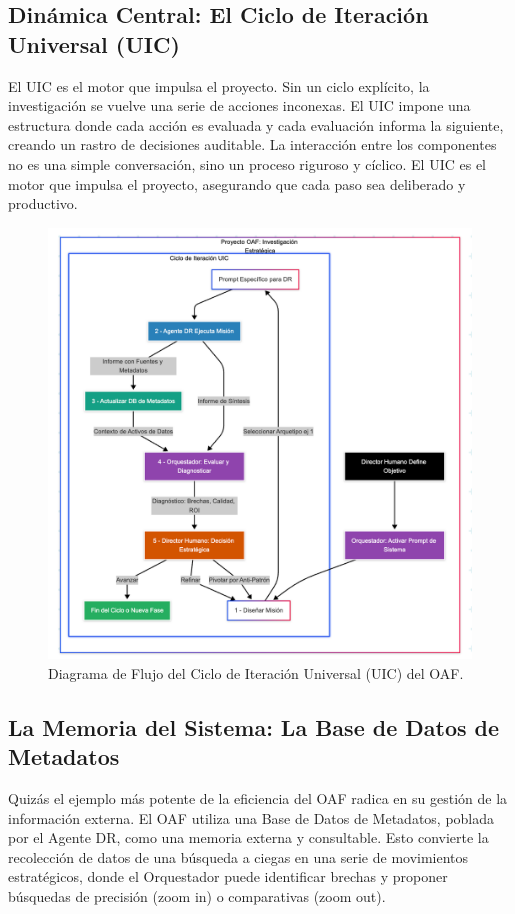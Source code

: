 \documentclass[11pt, a4paper]{article}
\begin{document}
\subsection{Dinámica Central: El Ciclo de Iteración Universal (UIC)}
El UIC es el motor que impulsa el proyecto. Sin un ciclo explícito, la investigación se vuelve una serie de acciones inconexas. El UIC impone una estructura donde cada acción es evaluada y cada evaluación informa la siguiente, creando un rastro de decisiones auditable. La interacción entre los componentes no es una simple conversación, sino un proceso riguroso y cíclico. El UIC es el motor que impulsa el proyecto, asegurando que cada paso sea deliberado y productivo.
\begin{figure}[H]
    \centering
    \includegraphics[width=\textwidth]{oaf_diagram.png}
    \caption{Diagrama de Flujo del Ciclo de Iteración Universal (UIC) del OAF.}
    \label{fig:oaf_diagram}
\end{figure}

\subsection{La Memoria del Sistema: La Base de Datos de Metadatos}
Quizás el ejemplo más potente de la eficiencia del OAF radica en su gestión de la información externa. El OAF utiliza una Base de Datos de Metadatos, poblada por el Agente DR, como una memoria externa y consultable. Esto convierte la recolección de datos de una búsqueda a ciegas en una serie de movimientos estratégicos, donde el Orquestador puede identificar brechas y proponer búsquedas de precisión (zoom in) o comparativas (zoom out).
\end{document}
